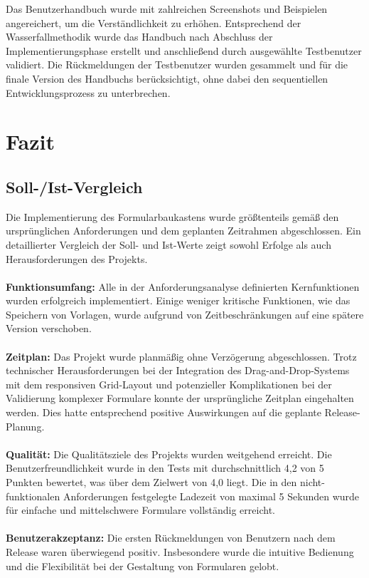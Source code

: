 \documentclass[a4paper,11pt]{article}
\begin{document}
\noindent Das Benutzerhandbuch wurde mit zahlreichen Screenshots und Beispielen angereichert, um die Verständlichkeit zu erhöhen. Entsprechend der Wasserfallmethodik wurde das Handbuch nach Abschluss der Implementierungsphase erstellt und anschließend durch ausgewählte Testbenutzer validiert. Die Rückmeldungen der Testbenutzer wurden gesammelt und für die finale Version des Handbuchs berücksichtigt, ohne dabei den sequentiellen Entwicklungsprozess zu unterbrechen.


\section{Fazit}
\subsection{Soll-/Ist-Vergleich}
Die Implementierung des Formularbaukastens wurde größtenteils gemäß den ursprünglichen Anforderungen und dem geplanten Zeitrahmen abgeschlossen. Ein detaillierter Vergleich der Soll- und Ist-Werte zeigt sowohl Erfolge als auch Herausforderungen des Projekts.\\
\\
\noindent \textbf{Funktionsumfang:} Alle in der Anforderungsanalyse definierten Kernfunktionen wurden erfolgreich implementiert. Einige weniger kritische Funktionen, wie das Speichern von Vorlagen, wurde aufgrund von Zeitbeschränkungen auf eine spätere Version verschoben.\\
\\
\noindent \textbf{Zeitplan:} Das Projekt wurde planmäßig ohne Verzögerung abgeschlossen. Trotz technischer Herausforderungen bei der Integration des Drag-and-Drop-Systems mit dem responsiven Grid-Layout und potenzieller Komplikationen bei der Validierung komplexer Formulare konnte der ursprüngliche Zeitplan eingehalten werden. Dies hatte entsprechend positive Auswirkungen auf die geplante Release-Planung.\\
\\
\noindent \textbf{Qualität:} Die Qualitätsziele des Projekts wurden weitgehend erreicht. Die Benutzerfreundlichkeit wurde in den Tests mit durchschnittlich 4,2 von 5 Punkten bewertet, was über dem Zielwert von 4,0 liegt. Die in den nicht-funktionalen Anforderungen festgelegte Ladezeit von maximal 5 Sekunden wurde für einfache und mittelschwere Formulare vollständig erreicht.\\
\\

\noindent \textbf{Benutzerakzeptanz:} Die ersten Rückmeldungen von Benutzern nach dem Release waren überwiegend positiv. Insbesondere wurde die intuitive Bedienung und die Flexibilität bei der Gestaltung von Formularen gelobt.
\end{document}

